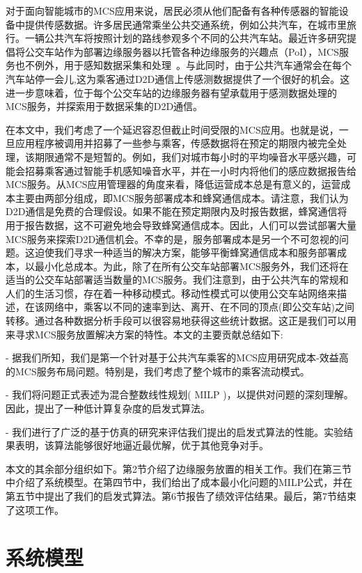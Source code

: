 对于面向智能城市的MCS应用来说，居民必须从他们配备有各种传感器的智能设备中提供传感数据。许多居民通常乘坐公共交通系统，例如公共汽车，在城市里旅行。一辆公共汽车将按照计划的路线参观多个不同的公共汽车站。最近许多研究提倡将公交车站作为部署边缘服务器以托管各种边缘服务的兴趣点（PoI），MCS服务也不例外，用于感知数据采集和处理~\cite{DBLP:journals/iotj/ZhanXZW18}。与此同时，由于公共汽车通常会在每个汽车站停一会儿,这为乘客通过D2D通信上传感测数据提供了一个很好的机会。这进一步意味着，位于每个公交车站的边缘服务器有望承载用于感测数据处理的MCS服务，并探索用于数据采集的D2D通信。


在本文中，我们考虑了一个延迟容忍但截止时间受限的MCS应用。也就是说，一旦应用程序被调用并招募了一些参与乘客，传感数据将在预定的期限内被完全处理，该期限通常不是短暂的。例如，我们对城市每小时的平均噪音水平感兴趣，可能会招募乘客通过智能手机感知噪音水平，并在一小时内将他们的感应数据报告给MCS服务。从MCS应用管理器的角度来看，降低运营成本总是有意义的，运营成本主要由两部分组成，即MCS服务部署成本和蜂窝通信成本。请注意，我们认为D2D通信是免费的合理假设。如果不能在预定期限内及时报告数据，蜂窝通信将用于报告数据，这不可避免地会导致蜂窝通信成本。因此，人们可以尝试部署大量MCS服务来探索D2D通信机会。不幸的是，服务部署成本是另一个不可忽视的问题。这迫使我们寻求一种适当的解决方案，能够平衡蜂窝通信成本和服务部署成本，以最小化总成本。为此，除了在所有公交车站部署MCS服务外，我们还将在适当的公交车站部署适当数量的MCS服务。我们注意到，由于公共汽车的常规和人们的生活习惯，存在着一种移动模式。移动性模式可以使用公交车站网络来描述，在该网络中，乘客以不同的速率到达、离开、在不同的顶点(即公交车站)之间转移。通过各种数据分析手段可以很容易地获得这些统计数据。这正是我们可以用来寻求MCS服务放置解决方案的特性。本文的主要贡献总结如下:

- 据我们所知，我们是第一个针对基于公共汽车乘客的MCS应用研究成本-效益高的MCS服务布局问题。特别是，我们考虑了整个城市的乘客流动模式。

- 我们将问题正式表述为混合整数线性规划( MILP )，以提供对问题的深刻理解。因此，提出了一种低计算复杂度的启发式算法。

- 我们进行了广泛的基于仿真的研究来评估我们提出的启发式算法的性能。实验结果表明，该算法能够很好地逼近最优解，优于其他竞争对手。

本文的其余部分组织如下。第2节介绍了边缘服务放置的相关工作。我们在第三节中介绍了系统模型。在第四节中，我们给出了成本最小化问题的MILP公式，并在第五节中提出了我们的启发式算法。第6节报告了绩效评估结果。最后，第7节结束了这项工作。


\section{系统模型}


